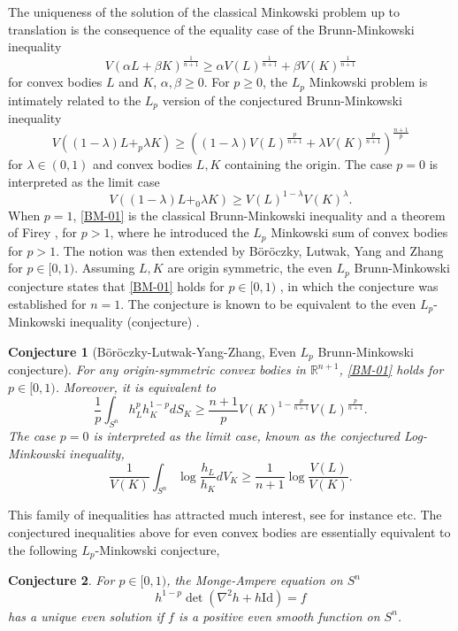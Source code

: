 \documentclass[reqno]{amsart}
\theoremstyle{remark}
\def\R{\mathbb{R}}
\theoremstyle{plain}
\newtheorem{conj}{Conjecture}
\begin{document}
The uniqueness of the solution of the classical Minkowski problem up to translation is the consequence of the equality case of the Brunn-Minkowski inequality
\begin{equation}
    V(\alpha L+\beta K)^{\frac{1}{n+1}}\geq \alpha V(L)^{\frac{1}{n+1}}+\beta V(K)^{\frac{1}{n+1}}
\end{equation}
for convex bodies $L$ and $K$, $\alpha, \beta \geq 0$. For $p\geq 0$, the $L_p$ Minkowski problem is intimately related to the $L_p$ version of the conjectured Brunn-Minkowski inequality 
\begin{equation}\label{BM-01}
    V((1-\lambda)L+_{p}\lambda K)\geq \left((1-\lambda)V(L)^{\frac{p}{n+1}}+\lambda V(K)^{\frac{p}{n+1}}\right)^{\frac{n+1}{p}}
\end{equation}
for $\lambda\in (0, 1)$ and convex bodies $L, K$ containing the origin. The case $p=0$ is interpreted as the limit case
\[
 V((1-\lambda)L+_{0}\lambda K)\geq V(L)^{1-\lambda} V(K)^{\lambda}.
\] When $p=1$, \eqref{BM-01} is the classical Brunn-Minkowski inequality and a theorem of Firey \cite{Firey64}, for $p>1$, where he introduced the $L_p$ Minkowski sum of convex bodies for $p>1$. The notion was then extended by B\"or\"oczky, Lutwak, Yang and Zhang \cite{BLYZ01} for $p\in [0, 1)$. 
Assuming $L, K$ are origin symmetric, the even $L_p$ Brunn-Minkowski conjecture states that \eqref{BM-01} holds for $p\in [0, 1)$ \cite[Problem 1.1, 1.5]{BLYZ01}, in which the conjecture was established for $n=1$. The conjecture is known to be equivalent to the even $L_p$-Minkowski inequality (conjecture) \cite[Lemma 3.1]{BLYZ01}.
\begin{conj}[B\"or\"oczky-Lutwak-Yang-Zhang, Even $L_p$ Brunn-Minkowski conjecture]
For any origin-symmetric convex bodies in $\R^{n+1}$, \eqref{BM-01} holds for $p\in [0, 1)$. Moreover, it is equivalent to 
\begin{equation}\label{BM-02}
    \frac{1}{p}\int_{S^n} h_L^p h_K^{1-p} dS_K\geq \frac{n+1}{p}V(K)^{1-\frac{p}{n+1}}V(L)^{\frac{p}{n+1}}.
\end{equation}
The case $p=0$ is interpreted as the limit case, known as the conjectured Log-Minkowski inequality,
\begin{equation}
    \frac{1}{V(K)}\int_{S^n} \log\frac{h_L}{h_K} dV_K\geq \frac{1}{n+1} \log \frac{V(L)}{V(K)}.
\end{equation}
\end{conj}
This family of inequalities has attracted much interest, see for instance \cite{ CLM, GZ, LMNZ, Ma, Rotem, Sar01, Sar02, XL, KM01, CHLL, Put, BK, Milman23, Xi} etc. 
The conjectured inequalities above for even convex bodies are essentially equivalent to the following $L_p$-Minkowski conjecture,
\begin{conj}
    For $p\in [0, 1)$, the Monge-Ampere equation on $S^n$
    \[
    h^{1-p}\det(\nabla^2 h+h\text{Id})=f
    \]
    has a unique even solution if $f$ is a positive even smooth function on $S^n$. 
\end{conj}
\end{document}
